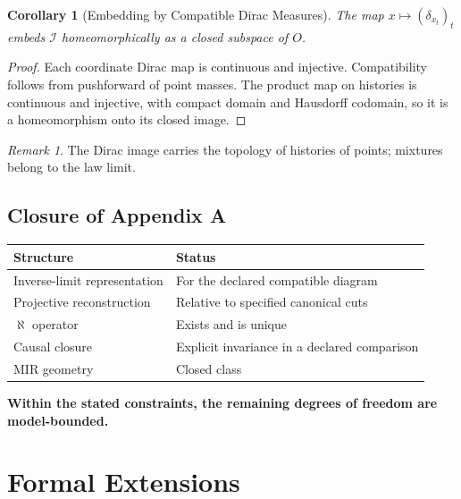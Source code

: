 \documentclass[11pt,a4paper]{article}
\theoremstyle{plain}
\newtheorem{corollary}[theorem]{Corollary}
\theoremstyle{definition}
\theoremstyle{remark}
\newtheorem{remark}[theorem]{Remark}
\begin{document}
\begin{corollary}[Embedding by Compatible Dirac Measures]\label{cor:obs-morphism}
The map $x\mapsto(\delta_{x_t})_t$ embeds $\mathcal I$ homeomorphically as a closed subspace of $O$.
\end{corollary}
\begin{proof}
Each coordinate Dirac map is continuous and injective. Compatibility follows from pushforward of point masses. The product map on histories is continuous and injective, with compact domain and Hausdorff codomain, so it is a homeomorphism onto its closed image.
\end{proof}

\begin{remark}\label{rem:point-vs-law-topology}
The Dirac image carries the topology of histories of points; mixtures belong to the law limit.
\end{remark}

\subsection{Closure of Appendix A}

\begin{center}
\begin{tabular}{|l|l|}
\hline
\textbf{Structure} & \textbf{Status} \\
\hline
Inverse-limit representation & For the declared compatible diagram \\
\hline
Projective reconstruction & Relative to specified canonical cuts \\
\hline
$\aleph$ operator & Exists and is unique \\
\hline
Causal closure & Explicit invariance in a declared comparison \\
\hline
MIR geometry & Closed class \\
\hline
\end{tabular}
\end{center}

\textbf{Within the stated constraints, the remaining degrees of freedom are model-bounded.}

\section{Formal Extensions}
\end{document}
